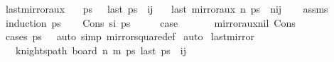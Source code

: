 \begin{isabellebody}
\isanewline
{}\isamarkupfalse%
%
\endisatagproof
{\isafoldproof}%
%
\isadelimproof
\isanewline
%
\endisadelimproof
\isanewline
{}\isamarkupfalse%
\ last{\isacharunderscore}{\kern0pt}mirror{}{\isacharunderscore}{\kern0pt}aux{\isacharcolon}{\kern0pt}\isanewline
\ \ \ {\isachardoublequoteopen}ps\ {\isasymnoteq}\ {\isacharbrackleft}{\kern0pt}{\isacharbrackright}{\kern0pt}{\isachardoublequoteclose}\ {\isachardoublequoteopen}last\ ps\ {\isacharequal}{\kern0pt}\ {\isacharparenleft}{\kern0pt}i{\isacharcomma}{\kern0pt}j{\isacharparenright}{\kern0pt}{\isachardoublequoteclose}\isanewline
\ \ \ {\isachardoublequoteopen}last\ {\isacharparenleft}{\kern0pt}mirror{}{\isacharunderscore}{\kern0pt}aux\ n\ ps{\isacharparenright}{\kern0pt}\ {\isacharequal}{\kern0pt}\ {\isacharparenleft}{\kern0pt}n{\isacharminus}{\kern0pt}i{\isacharcomma}{\kern0pt}j{\isacharparenright}{\kern0pt}{\isachardoublequoteclose}\isanewline
%
\isadelimproof
\ \ %
\endisadelimproof
%
\isatagproof
{}\isamarkupfalse%
\ assms\isanewline
{}\isamarkupfalse%
\ {\isacharparenleft}{\kern0pt}induction\ ps{\isacharparenright}{\kern0pt}\isanewline
\ \ \isamarkupfalse%
\ {\isacharparenleft}{\kern0pt}Cons\ s\isactrlsub i\ ps{\isacharparenright}{\kern0pt}\isanewline
\ \ \isamarkupfalse%
\ \isamarkupfalse%
\ {\isacharquery}{\kern0pt}case\ \isanewline
\ \ \ \ \isamarkupfalse%
\ mirror{}{\isacharunderscore}{\kern0pt}aux{\isacharunderscore}{\kern0pt}nil\ Cons\ \isamarkupfalse%
\ {\isacharparenleft}{\kern0pt}cases\ {\isachardoublequoteopen}ps\ {\isacharequal}{\kern0pt}\ {\isacharbrackleft}{\kern0pt}{\isacharbrackright}{\kern0pt}{\isachardoublequoteclose}{\isacharparenright}{\kern0pt}\ {\isacharparenleft}{\kern0pt}auto\ simp{\isacharcolon}{\kern0pt}\ mirror{}{\isacharunderscore}{\kern0pt}square{\isacharunderscore}{\kern0pt}def{\isacharparenright}{\kern0pt}\isanewline
{}\isamarkupfalse%
\ auto%
\endisatagproof
{\isafoldproof}%
%
\isadelimproof
\isanewline
%
\endisadelimproof
\isanewline
{}\isamarkupfalse%
\ last{\isacharunderscore}{\kern0pt}mirror{}{\isacharcolon}{\kern0pt}\isanewline
\ \ \ {\isachardoublequoteopen}knights{\isacharunderscore}{\kern0pt}path\ {\isacharparenleft}{\kern0pt}board\ n\ m{\isacharparenright}{\kern0pt}\ ps{\isachardoublequoteclose}\ {\isachardoublequoteopen}last\ ps\ {\isacharequal}{\kern0pt}\ {\isacharparenleft}{\kern0pt}i{\isacharcomma}{\kern0pt}j{\isacharparenright}{\kern0pt}{\isachardoublequoteclose}\isanewline

\end{isabellebody}
